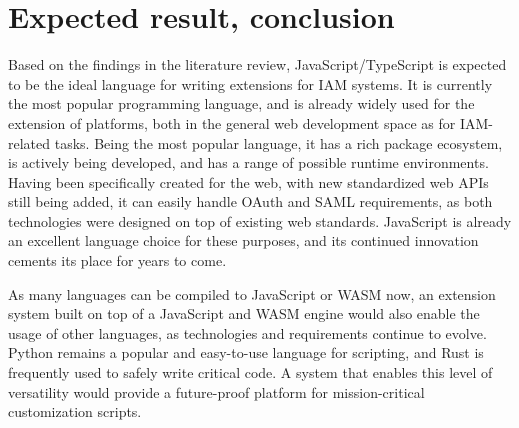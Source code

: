 \section{Expected result, conclusion}%
\label{sec:expected_results}

Based on the findings in the literature review, JavaScript/TypeScript is expected to be the ideal language for writing extensions for IAM systems. It is currently the most popular programming language, and is already widely used for the extension of platforms, both in the general web development space as for IAM-related tasks. Being the most popular language, it has a rich package ecosystem, is actively being developed, and has a range of possible runtime environments. Having been specifically created for the web, with new standardized web APIs still being added, it can easily handle OAuth and SAML requirements, as both technologies were designed on top of existing web standards. JavaScript is already an excellent language choice for these purposes, and its continued innovation cements its place for years to come.

As many languages can be compiled to JavaScript or WASM now, an extension system built on top of a JavaScript and WASM engine would also enable the usage of other languages, as technologies and requirements continue to evolve. Python remains a popular and easy-to-use language for scripting, and Rust is frequently used to safely write critical code. A system that enables this level of versatility would provide a future-proof platform for mission-critical customization scripts.

